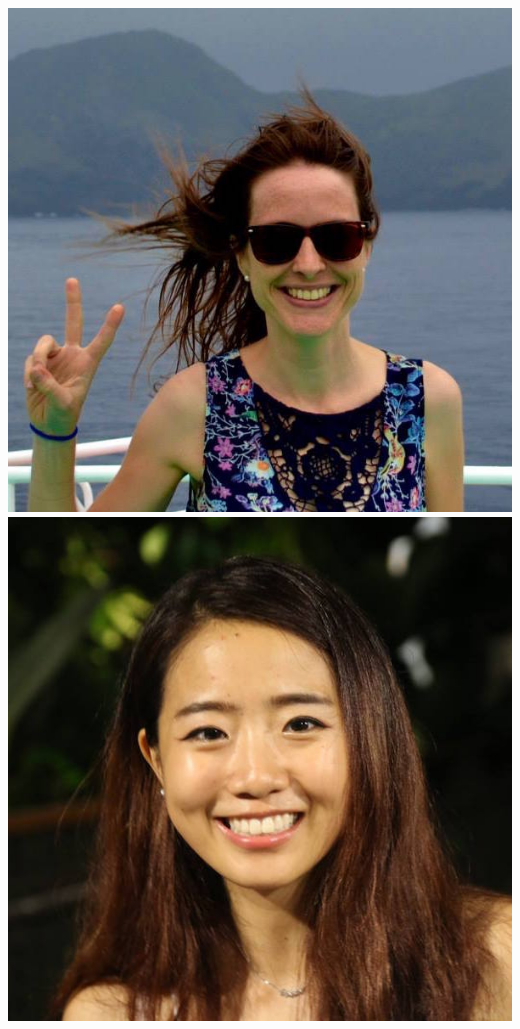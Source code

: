 \documentclass{beamer}
\begin{document}
\begin{frame}
\begin{columns}
\begin{columns}
\includegraphics[width=\textwidth]{Angela.jpg}
\includegraphics[width=\textwidth]{TT.jpg}

\end{columns}
\end{columns}
\end{frame}
\end{document}

